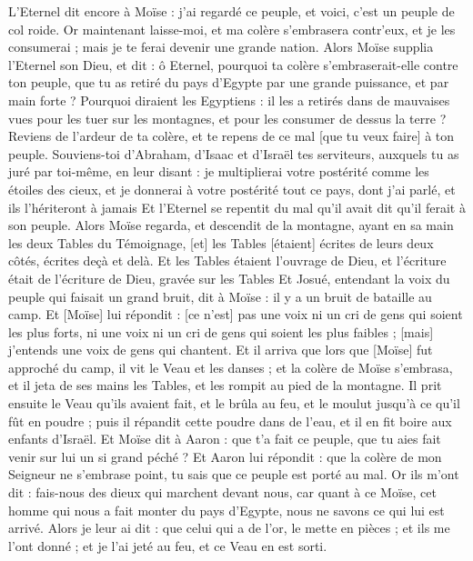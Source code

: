 \begin{multicols}{2}
L'Eternel dit encore à Moïse : j'ai regardé ce peuple, et voici, c'est un peuple de col roide.
Or maintenant laisse-moi, et ma colère s'embrasera contr’eux, et je les consumerai ; mais je te ferai devenir une grande nation.
Alors Moïse supplia l'Eternel son Dieu, et dit : ô Eternel, pourquoi ta colère s'embraserait-elle contre ton peuple, que tu as retiré du pays d'Egypte par une grande puissance, et par main forte ?
Pourquoi diraient les Egyptiens : il les a retirés dans de mauvaises vues pour les tuer sur les montagnes, et pour les consumer de dessus la terre ? Reviens de l'ardeur de ta colère, et te repens de ce mal [que tu veux faire] à ton peuple.
Souviens-toi d'Abraham, d'Isaac et d'Israël tes serviteurs, auxquels tu as juré par toi-même, en leur disant : je multiplierai votre postérité comme les étoiles des cieux, et je donnerai à votre postérité tout ce pays, dont j'ai parlé, et ils l'hériteront à jamais
Et l'Eternel se repentit du mal qu'il avait dit qu'il ferait à son peuple.
Alors Moïse regarda, et descendit de la montagne, ayant en sa main les deux Tables du Témoignage, [et] les Tables [étaient] écrites de leurs deux côtés, écrites deçà et delà.
Et les Tables étaient l'ouvrage de Dieu, et l'écriture était de l'écriture de Dieu, gravée sur les Tables
Et Josué, entendant la voix du peuple qui faisait un grand bruit, dit à Moïse : il y a un bruit de bataille au camp.
Et [Moïse] lui répondit : [ce n'est] pas une voix ni un cri de gens qui soient les plus forts, ni une voix ni un cri de gens qui soient les plus faibles ; [mais] j'entends une voix de gens qui chantent.
Et il arriva que lors que [Moïse] fut approché du camp, il vit le Veau et les danses ; et la colère de Moïse s'embrasa, et il jeta de ses mains les Tables, et les rompit au pied de la montagne.
Il prit ensuite le Veau qu'ils avaient fait, et le brûla au feu, et le moulut jusqu’à ce qu'il fût en poudre ; puis il répandit cette poudre dans de l'eau, et il en fit boire aux enfants d'Israël.
Et Moïse dit à Aaron : que t'a fait ce peuple, que tu aies fait venir sur lui un si grand péché ?
Et Aaron lui répondit : que la colère de mon Seigneur ne s'embrase point, tu sais que ce peuple est porté au mal.
Or ils m'ont dit : fais-nous des dieux qui marchent devant nous, car quant à ce Moïse, cet homme qui nous a fait monter du pays d'Egypte, nous ne savons ce qui lui est arrivé.
Alors je leur ai dit : que celui qui a de l'or, le mette en pièces ; et ils me l'ont donné ; et je l'ai jeté au feu, et ce Veau en est sorti.

\end{multicols}
